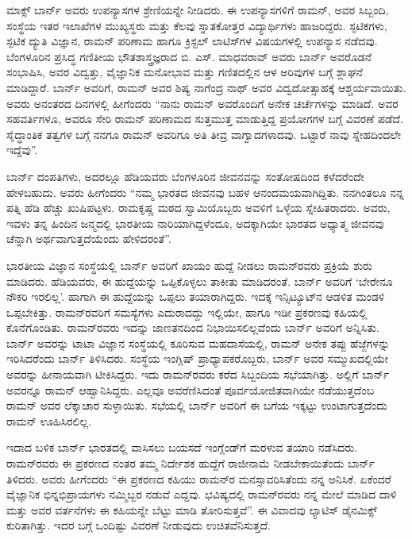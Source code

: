 ಮಾಕ್ಸ್ ಬಾರ್ನ್ ಅವರು ಉಪನ್ಯಾಸಗಳ ಶ್ರೇಣಿಯನ್ನೇ ನೀಡಿದರು. ಈ ಉಪನ್ಯಾಸಗಳಿಗೆ ರಾಮನ್, ಅವರ ಸಿಬ್ಬಂದಿ, ಸಂಸ್ಥೆಯ ಇತರ ಇಲಾಖೆಗಳ ಮುಖ್ಯಸ್ಥರು ಮತ್ತು ಕೆಲವು ಸ್ನಾತಕೋತ್ತರ ವಿದ್ಯಾರ್ಥಿಗಳು ಹಾಜರಿದ್ದರು. ಸ್ಫಟಿಕಗಳು, ಸ್ಫಟಿಕ ದ್ಯುತಿ ವಿಜ್ಞಾನ, ರಾಮನ್ ಪರಿಣಾಮ ಹಾಗೂ ಕ್ರಿಸ್ಟಲ್ ಲಾಟಿಸ್‍ಗಳ ವಿಷಯಗಳಲ್ಲಿ ಉಪನ್ಯಾಸ ನಡೆದವು. ಬೆಂಗಳೂರಿನ ಪ್ರಸಿದ್ಧ ಗಣಿತೀಯ ಭೌತಶಾಸ್ತ್ರಜ್ಞರಾದ ಬಿ. ಎಸ್. ಮಾಧವರಾವ್ ಅವರು ಬಾರ್ನ್ ಅವರೊಡನೆ ಸಂಭಾಷಿಸಿ, ಅವರ ವಿದ್ವತ್ತು, ವೈಜ್ಞಾನಿಕ ಮನೋಭಾವ ಮತ್ತು ಗಣಿತದಲ್ಲಿನ ಆಳ ಅರಿವುಗಳ ಬಗ್ಗೆ ಶ್ಲಾಘನೆ ಮಾಡಿದ್ದಾರೆ. ಬಾರ್ನ್ ಅವರಿಗೆ, ರಾಮನ್ ಅವರ ಶಿಷ್ಯ ನಾಗೆಂದ್ರ ನಾಥ್ ಅವರ ವಿದ್ವದೋತ್ಸಾಹಕ್ಕೆ ಆಶ್ಚರ್ಯವಾಯಿತು. ಅವರು ಅನಂತರದ ದಿನಗಳಲ್ಲಿ ಹೀಗೆಂದರು\enginline{-} “ನಾನು ರಾಮನ್ ಅವರೊಂದಿಗೆ ಅನೇಕ ಚರ್ಚೆಗಳನ್ನು ಮಾಡಿದೆ. ಅವರ ಸಹವರ್ತಿಗಳೂ, ಅವರೂ ಸೇರಿ ರಾಮನ್ ಪರಿಣಾಮದ ಸುತ್ತಮುತ್ತ ಮಾಡುತ್ತಿದ್ದ ಪ್ರಯೋಗಗಳ ಬಗ್ಗೆ ವಿವರಣೆ ಪಡೆದೆ. ಸೈದ್ಧಾಂತಿಕ ತತ್ವಗಳ ಬಗ್ಗೆ ನನಗೂ ರಾಮನ್ ಅವರಿಗೂ ಅತಿ ತೀವ್ರ ವಾಗ್ವಾದಗಳಾದವು. ಒಟ್ಟಾರೆ ನಾವು ಸ್ನೇಹದಿಂದಲೇ ಇದ್ದೆವು”.

\vskip 2pt

ಬಾರ್ನ್ ದಂಪತಿಗಳು, ಅದರಲ್ಲೂ ಹೆಡಿಯವರು ಬೆಂಗಳೂರಿನ ಜೀವನವನ್ನು ಸಂತೋಷದಿಂದ ಕಳೆದರೆಂದೇ ಹೇಳಬಹುದು. ಅವರು ಹೀಗೆಂದರು\enginline{-} “ನಮ್ಮ ಭಾರತದ ಜೀವನವು ಬಹಳ ಆನಂದಮಯವಾಗಿದ್ದಿತು. ನನಗಿಂತಲೂ ನನ್ನ ಪತ್ನಿ ಹೆಡಿ ಹೆಚ್ಚು ಖುಷಿಪಟ್ಟಳು. ರಾಮಕೃಷ್ಣ ಮಠದ ಸ್ವಾಮಿಯೊಬ್ಬರು ಅವಳಿಗೆ ಒಳ್ಳೆಯ ಸ್ನೇಹಿತರಾದರು. ಅವರು, ಇವಳು ತನ್ನ ಹಿಂದಿನ ಜನ್ಮದಲ್ಲಿ ಭಾರತೀಯ ನಾರಿಯಾಗಿದ್ದಳೆಂದೂ, ಅದಕ್ಕಾಗಿಯೇ ಭಾರತದ ಅಧ್ಯಾತ್ಮ ಜೀವನವು ಚೆನ್ನಾಗಿ ಅರ್ಥವಾಗುತ್ತದೆಯೆಂದು ಹೇಳಿದರಂತೆ”.

\vskip 2pt

ಭಾರತೀಯ ವಿಜ್ಞಾನ ಸಂಸ್ಥೆಯಲ್ಲಿ ಬಾರ್ನ್ ಅವರಿಗೆ ಖಾಯಂ ಹುದ್ದೆ ನೀಡಲು ರಾಮನ್‍ರವರು ಪ್ರಕ್ರಿಯೆ ಶುರು ಮಾಡಿದರು. ಹೆಡಿಯವರು, ಈ ಹುದ್ದೆಯನ್ನು ಒಪ್ಪಿಕೊಳ್ಳಲು ತಾಕೀತು ಮಾಡಿದರಂತೆ. ಬಾರ್ನ್ ಅವರಿಗೆ ‘ಬೇರೇನೂ ನೌಕರಿ ಇರಲಿಲ್ಲ’. ಹಾಗಾಗಿ ಈ ಹುದ್ದೆಯನ್ನು ಒಪ್ಪಲು ತಯಾರಾಗಿದ್ದರು. ಇದಕ್ಕೆ ಇನ್ಸಿಟ್ಯೂಟ್‍ನ ಆಡಳಿತ ಮಂಡಳಿ ಒಪ್ಪಬೇಕಿತ್ತು. ರಾಮನ್‍ರವರಿಗೆ ಸಮಸ್ಯೆಗಳು ಎದುರಾದದ್ದು ಇಲ್ಲಿಯೇ, ಹಾಗೂ ಇಡೀ ಪ್ರಕರಣವು ಕಹಿಯಲ್ಲಿ ಕೊನೆಗೊಂಡಿತು. ರಾಮನ್‍ರವರು ಇದನ್ನು ಜಾಣತನದಿಂದ ನಿಭಾಯಿಸಲಿಲ್ಲವೆಂದು ಬಾರ್ನ್ ಅವರಿಗೆ ಅನ್ನಿಸಿತು. ಬಾರ್ನ್ ಅವರನ್ನು ಟಾಟಾ ವಿಜ್ಞಾನ ಸಂಸ್ಥೆಯಲ್ಲಿ ಕೂರಿಸುವ ಮಹದಾಸೆಯಲ್ಲಿ, ರಾಮನ್ ಅನೇಕ ತಪ್ಪು ಹೆಜ್ಜೆಗಳನ್ನು ಇರಿಸಿದರೆಂದು ಬಾರ್ನ್ ತಿಳಿಸಿದರು. ಸಂಸ್ಥೆಯ ಇಂಗ್ಲಿಷ್ ಪ್ರಾಧ್ಯಾಪಕರೊಬ್ಬರು, ಬಾರ್ನ್ ಅವರ ಸಮ್ಮುಖದಲ್ಲಿಯೇ ಅವರನ್ನು ಹೀನಾಯವಾಗಿ ಟೀಕಿಸಿದ್ದರು. ಇದು ರಾಮನ್‍ರವರು ಕರೆದ ಸಿಬ್ಬಂದಿಯ ಸಭೆಯಾಗಿತ್ತು. ಅಲ್ಲಿಗೆ ಬಾರ್ನ್ ಅವರನ್ನೂ ರಾಮನ್ ಆಹ್ವಾನಿಸಿದ್ದರು. ಎಲ್ಲವೂ ಅವರೆಣಿಸಿದಂತೆ ಪೂರ್ವಯೋಜಿತವಾಗಿಯೇ ನಡೆಯುತ್ತದೆಂಬ ರಾಮನ್ ಅವರ ಲೆಕ್ಕಾಚಾರ ಸುಳ್ಳಾಯಿತು. ಸಭೆಯಲ್ಲಿ ಬಾರ್ನ್ ಅವರಿಗೆ ಈ ಬಗೆಯ ಇಕ್ಕಟ್ಟು ಉಂಟಾಗುತ್ತದೆಂದು ರಾಮನ್ ಊಹಿಸಿರಲಿಲ್ಲ.

\vskip 2pt

ಇದಾದ ಬಳಿಕ ಬಾರ್ನ್ ಭಾರತದಲ್ಲಿ ವಾಸಿಸಲು ಬಯಸದೆ ಇಂಗ್ಲೆಂಡ್‍ಗೆ ಮರಳುವ ತಯಾರಿ ನಡೆಸಿದರು. ರಾಮನ್‍ರವರು ಈ ಪ್ರಕರಣದ ನಂತರ ತಮ್ಮ ನಿರ್ದೇಶಕ ಹುದ್ದೆಗೆ ರಾಜೀನಾಮೆ ನೀಡಬೇಕಾಯಿತೆಂದು ಬಾರ್ನ್ ತಿಳಿದರು. ಅವರು ಹೀಗೆಂದರು\enginline{-} “ಈ ಪ್ರಕರಣದ ಕಹಿಯು ರಾಮನ್‍ರ ಮನಸ್ಸಾವರಿಸಿತೆಂದು ನನ್ನ ಅನಿಸಿಕೆ. ಏಕೆಂದರೆ ವೈಜ್ಞಾನಿಕ ಭಿನ್ನಭಿಪ್ರಾಯಗಳು ನಮ್ಮಿಬ್ಬರ ನಡುವೆ ಎದ್ದವು. ಭವಿಷ್ಯದಲ್ಲಿ ರಾಮನ್‍ರವರು ನನ್ನ ಮೇಲೆ ಮಾಡಿದ ದಾಳಿ ಮತ್ತು ಅವರ ವರ್ತನೆಗಳು ಈ ಕಹಿಯನ್ನೇ ಬೆಟ್ಟು ಮಾಡಿ ತೋರಿಸುತ್ತವೆ”. ಈ ವಿವಾದವು ಲ್ಯಾಟಿಸ್ ಡೈನಮಿಕ್ಸ್ ಕುರಿತಾಗಿತ್ತು. ಇದರ ಬಗ್ಗೆ ಒಂದಿಷ್ಟು ವಿವರಣೆ ನೀಡುವುದು ಉಚಿತವೆನಿಸುತ್ತದೆ.


